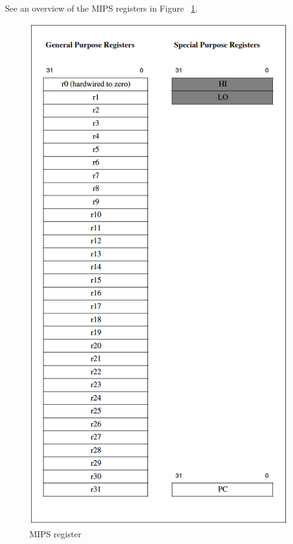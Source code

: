 \documentclass[
  oneside,
  11pt, a4paper,
  footinclude=true,
  headinclude=true,
  cleardoublepage=empty
]{scrbook}
\begin{document}
See an overview of the MIPS registers in Figure ~\ref{fig:MIPS_register}.

\begin{figure}[h!]
  \centering
    \includegraphics[scale=0.91]{img/mips_register.png}
    \caption{MIPS register}
    \label{fig:MIPS_register}
\end{figure}
\end{document}
